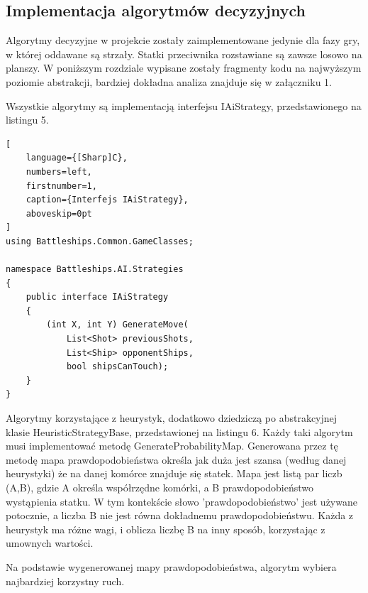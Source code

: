 \subsection{Implementacja algorytmów decyzyjnych}
\indent Algorytmy decyzyjne w projekcie zostały zaimplementowane jedynie dla fazy gry, w której oddawane są strzały. Statki przeciwnika rozstawiane są zawsze losowo na planszy. W poniższym rozdziale wypisane zostały fragmenty kodu na najwyższym poziomie abstrakcji, bardziej dokładna analiza znajduje się w załączniku 1.

Wszystkie algorytmy są implementacją interfejsu IAiStrategy, przedstawionego na listingu 5.

\begin{addmargin}[10mm]{0mm}
\begin{lstlisting}[
    language={[Sharp]C},
    numbers=left,
    firstnumber=1,
    caption={Interfejs IAiStrategy},
    aboveskip=0pt
]
using Battleships.Common.GameClasses;

namespace Battleships.AI.Strategies
{
    public interface IAiStrategy
    {
        (int X, int Y) GenerateMove(
            List<Shot> previousShots,
            List<Ship> opponentShips,
            bool shipsCanTouch);
    }
}
\end{lstlisting}
\end{addmargin}

Algorytmy korzystające z heurystyk, dodatkowo dziedziczą po abstrakcyjnej klasie HeuristicStrategyBase, przedstawionej na listingu 6. Każdy taki algorytm musi implementować metodę GenerateProbabilityMap. Generowana przez tę metodę mapa prawdopodobieństwa określa jak duża jest szansa (według danej heurystyki) że na danej komórce znajduje się statek. Mapa jest listą par liczb (A,B), gdzie A określa współrzędne komórki, a B prawdopodobieństwo wystąpienia statku. W tym kontekście słowo 'prawdopodobieństwo' jest używane potocznie, a liczba B nie jest równa dokładnemu prawdopodobieństwu. Każda z heurystyk ma różne wagi, i oblicza liczbę B na inny sposób, korzystając z umownych wartości.

\indent Na podstawie wygenerowanej mapy prawdopodobieństwa, algorytm wybiera najbardziej korzystny ruch. 

